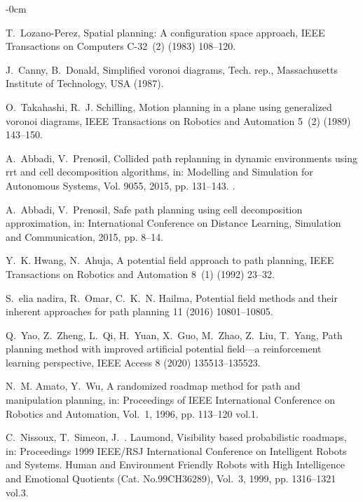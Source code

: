 \documentclass[journal,article,submit,pdftex,moreauthors]{Definitions/mdpi}
\begin{document}
\begin{adjustwidth}{-\extralength}{0cm}
\begin{thebibliography}{10}
	T.~Lozano-Perez, Spatial planning: A configuration space approach, IEEE
	  Transactions on Computers C-32~(2) (1983) 108--120.
	
	J.~Canny, B.~Donald, Simplified voronoi diagrams, Tech. rep., Massachusetts
	  Institute of Technology, USA (1987).
	
	O.~{Takahashi}, R.~J. {Schilling}, Motion planning in a plane using generalized
	  voronoi diagrams, IEEE Transactions on Robotics and Automation 5~(2) (1989)
	  143--150.
	
	A.~Abbadi, V.~Prenosil, Collided path replanning in dynamic environments using
	  rrt and cell decomposition algorithms, in: Modelling and Simulation for
	  Autonomous Systems, Vol. 9055, 2015, pp. 131--143.
	\newblock \href {https://doi.org/10.1007/978-3-319-22383-4\_9}
	  {}.
	
	A.~Abbadi, V.~Prenosil, Safe path planning using cell decomposition
	  approximation, in: International Conference on Distance Learning, Simulation
	  and Communication, 2015, pp. 8--14.
	
	Y.~K. {Hwang}, N.~{Ahuja}, A potential field approach to path planning, IEEE
	  Transactions on Robotics and Automation 8~(1) (1992) 23--32.
	
	S.~elia nadira, R.~Omar, C.~K.~N. Hailma, Potential field methods and their
	  inherent approaches for path planning 11 (2016) 10801--10805.
	
	Q.~{Yao}, Z.~{Zheng}, L.~{Qi}, H.~{Yuan}, X.~{Guo}, M.~{Zhao}, Z.~{Liu},
	  T.~{Yang}, Path planning method with improved artificial potential field—a
	  reinforcement learning perspective, IEEE Access 8 (2020) 135513--135523.
	
	N.~M. {Amato}, Y.~{Wu}, A randomized roadmap method for path and manipulation
	  planning, in: Proceedings of IEEE International Conference on Robotics and
	  Automation, Vol.~1, 1996, pp. 113--120 vol.1.
	
	C.~{Nissoux}, T.~{Simeon}, J.~. {Laumond}, Visibility based probabilistic
	  roadmaps, in: Proceedings 1999 IEEE/RSJ International Conference on
	  Intelligent Robots and Systems. Human and Environment Friendly Robots with
	  High Intelligence and Emotional Quotients (Cat. No.99CH36289), Vol.~3, 1999,
	  pp. 1316--1321 vol.3.
	

\end{thebibliography}
\end{adjustwidth}
\end{document}
